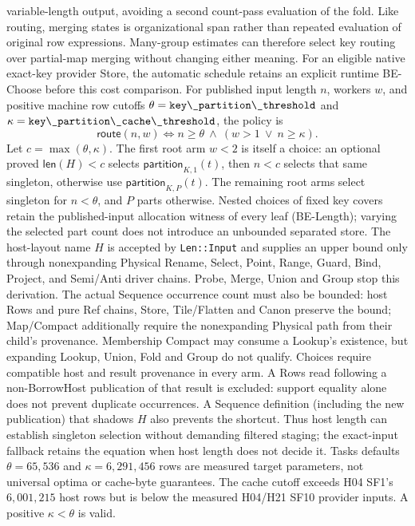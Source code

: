 variable-length output, avoiding a second count-pass evaluation of the fold.
Like routing, merging states is organizational span rather than repeated
evaluation of original row expressions. Many-group estimates can therefore
select key routing over partial-map merging without changing either meaning.
For an eligible native exact-key provider Store, the automatic schedule retains
an explicit runtime BE-Choose before this cost comparison. For published
input length \(n\), workers \(w\), and positive machine row cutoffs
\(\theta=\code{key\_partition\_threshold}\) and
\(\kappa=\code{key\_partition\_cache\_threshold}\), the policy is
\[
  \mathsf{route}(n,w)\iff n\geq\theta\ \land\ (w>1\ \lor\ n\geq\kappa).
\]
Let \(c=\max(\theta,\kappa)\). The first root arm \(w<2\) is itself a choice:
an optional proved \(\mathsf{len}(H)<c\) selects
\(\mathsf{partition}_{K,1}(t)\), then \(n<c\) selects that same singleton,
otherwise use \(\mathsf{partition}_{K,P}(t)\). The remaining root arms
select singleton for \(n<\theta\), and \(P\) parts otherwise.
Nested choices of fixed key covers retain the published-input allocation
witness of every leaf (BE-Length); varying the selected part count does not
introduce an unbounded separated store.
The host-layout name \(H\) is accepted by \texttt{Len::Input} and supplies an
upper bound only through nonexpanding Physical Rename, Select, Point, Range,
Guard, Bind, Project, and Semi/Anti driver chains. Probe, Merge, Union and Group
stop this derivation. The actual Sequence occurrence count must also be bounded:
host Rows and pure Ref chains, Store, Tile/Flatten and Canon preserve the bound;
Map/Compact additionally require the nonexpanding Physical path from their
child's provenance. Membership Compact may consume a Lookup's existence,
but expanding Lookup, Union, Fold and Group do not qualify. Choices require
compatible host and result provenance in every arm. A Rows read following a
non-BorrowHost publication of that result is excluded: support equality alone
does not prevent duplicate occurrences. A Sequence definition (including the
new publication) that shadows \(H\) also prevents the shortcut. Thus host length
can establish singleton selection without demanding filtered staging; the
exact-input fallback retains the equation when host length does not decide it.
Tasks defaults \(\theta=65{,}536\) and \(\kappa=6{,}291{,}456\) rows are
measured target parameters, not universal optima or cache-byte guarantees.
The cache cutoff exceeds H04 SF1's \(6{,}001{,}215\) host rows but is below the
measured H04/H21 SF10 provider inputs. A positive \(\kappa<\theta\) is valid.
